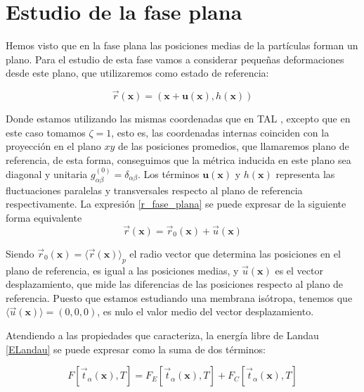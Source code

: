 \section{Estudio de la fase plana}

Hemos visto que en la fase plana las posiciones medias de la partículas forman
un plano. Para el estudio de esta fase vamos a considerar pequeñas
deformaciones desde este plano, que utilizaremos como estado de referencia:

\begin{equation}\label{r_fase_plana}
\vec{r}(\mathbf{x})=(\mathbf{x}+\mathbf{u(\mathbf{x})},h(\mathbf{x}))
\end{equation}

Donde estamos utilizando las mismas coordenadas que en TAL , excepto que en
este caso tomamos $\zeta=1$, esto es, las coordenadas internas coinciden con
la proyección en el plano $xy$ de las posiciones promedios, que llamaremos
plano de referencia, de esta forma, conseguimos que la métrica inducida en
este plano sea diagonal y unitaria
$g^{(0)}_{\alpha\beta}=\delta_{\alpha\beta}$. Los términos
$\mathbf{u(\mathbf{x})}$ y $h(\mathbf{x})$ 
representa las fluctuaciones paralelas y transversales respecto al plano de
referencia respectivamente. La expresión \eqref{r_fase_plana} se puede
expresar de la siguiente forma equivalente
\begin{equation}\label{deformacion}
\vec{r}(\mathbf{x})=\vec{r}_0(\mathbf{x})+\vec{u}(\mathbf{x})
\end{equation}

Siendo $\vec{r}_0(\mathbf{x})=\langle\vec{r}(\mathbf{x}) \rangle_p$ el radio
vector que determina las posiciones en el plano de referencia, es igual a las
posiciones medias, y $\vec{u}(\mathbf{x})$ es el vector desplazamiento, que
mide las diferencias de las posiciones respecto al plano de referencia. Puesto
que estamos estudiando una membrana isótropa, tenemos que
$\langle\vec{u}(\mathbf{x}) \rangle=(0,0,0)$, es nulo el valor medio del
vector desplazamiento.


Atendiendo a las propiedades que caracteriza, la energía libre de Landau
\eqref{ELandau} se puede expresar como la suma de dos términos:

\begin{equation}
 F[\vec{t}_{\alpha}(\mathbf{x}),T]= F_E[\vec{t}_{\alpha}(\mathbf{x}),T]+F_C[\vec{t}_{\alpha}(\mathbf{x}),T]
\end{equation}

